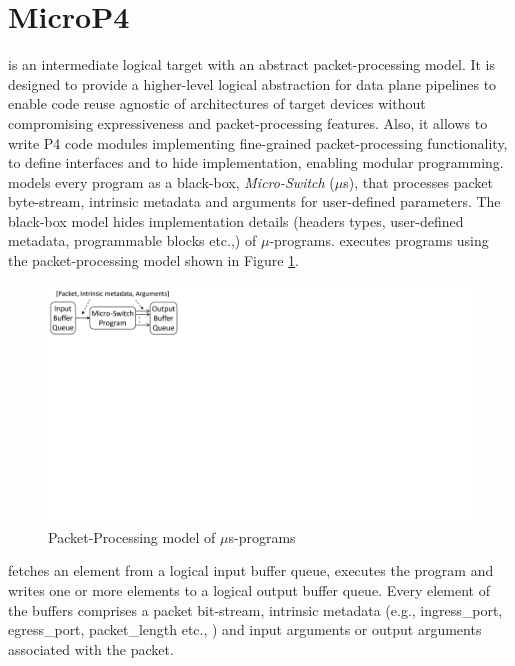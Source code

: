 \documentclass[letterpaper,twocolumn,10pt]{article}
\begin{document}
\section{MicroP4}
\label{sec:microp4}
\ulang is an intermediate logical target with an abstract packet-processing model.
It is designed to provide a higher-level logical abstraction for data plane pipelines to enable code reuse agnostic of architectures of target devices without compromising expressiveness and packet-processing features.
Also, it allows to write P4 code modules implementing fine-grained packet-processing functionality, to define interfaces and to hide implementation, enabling modular programming.
\ulang models every program as a black-box, \emph{Micro-Switch} ($\mu$s), that processes packet byte-stream, intrinsic metadata and arguments for user-defined parameters.
The black-box model hides implementation details (headers types, user-defined metadata, programmable blocks etc.,) of $\mu$-programs.
\ulang executes programs using the packet-processing model shown in Figure \ref{fig:mp4-packet-processing-model}.
\begin{figure}[h]
    \centering
    \includegraphics[trim=0 420 667 0, clip, scale=0.5]{microp4-program-model}
    \caption{Packet-Processing model of $\mu$s-programs}
    \label{fig:mp4-packet-processing-model}
\end{figure}
\ulang fetches an element from a logical input buffer queue, executes the program and writes one or more elements to a logical output buffer queue.
Every element of the buffers comprises a packet bit-stream, intrinsic metadata (e.g., ingress\_port, egress\_port, packet\_length etc., ) and input arguments or output arguments associated with the packet.
\end{document}
